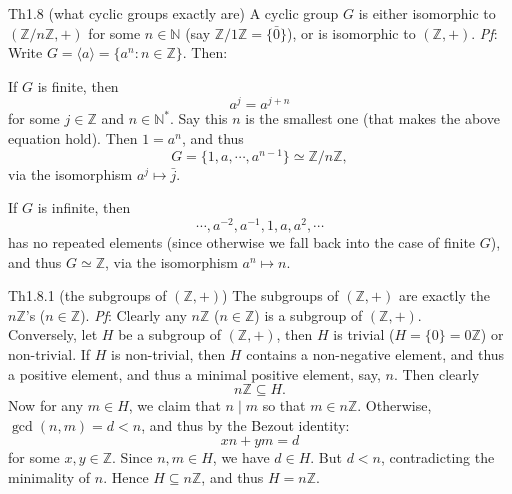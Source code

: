 \documentclass{article}
\begin{document}
\begin{Th}{Th1.8 (what cyclic groups exactly are)}
    A cyclic group $G$ is either isomorphic to $(\mathbb{Z}/n\mathbb{Z}, +)$ for some $n\in\mathbb{N}$ (say $\mathbb{Z}/1\mathbb{Z} = \{\bar{0}\}$), or is isomorphic to $(\mathbb{Z}, +)$.
    \tcblower
    \textit{Pf}: Write $G = \langle a\rangle = \{a^n: n\in\mathbb{Z}\}$. Then:
    \begin{compactenum}
        \item If $G$ is finite, then 
        $$ a^j = a^{j+n} $$
        for some $j\in\mathbb{Z}$ and $n\in\mathbb{N}^\ast$. Say this $n$ is the smallest one (that makes the above equation hold). Then $1 = a^n$, and thus
        $$ G = \{1, a, \cdots, a^{n-1}\} \simeq \mathbb{Z}/n\mathbb{Z}, $$
        via the isomorphism $a^j\mapsto \bar{j}$.
        \item If $G$ is infinite, then 
        $$ \cdots, a^{-2}, a^{-1}, 1, a, a^2, \cdots $$
        has no repeated elements (since otherwise we fall back into the case of finite $G$), and thus $G\simeq\mathbb{Z}$, via the isomorphism $a^n\mapsto n$.
    \end{compactenum}
\end{Th}

\begin{Th}{Th1.8.1 (the subgroups of $(\mathbb{Z}, +)$)}
    The subgroups of $(\mathbb{Z}, +)$ are exactly the $n\mathbb{Z}$'s ($n\in\mathbb{Z}$).
    \tcblower
    \textit{Pf}: Clearly any $n\mathbb{Z}$ ($n\in\mathbb{Z}$) is a subgroup of $(\mathbb{Z}, +)$. \\
    Conversely, let $H$ be a subgroup of $(\mathbb{Z}, +)$, then $H$ is trivial ($H = \{0\} = 0\mathbb{Z}$) or non-trivial. If $H$ is non-trivial, then $H$ contains a non-negative element, and thus a positive element, and thus a minimal positive element, say, $n$. Then clearly
    $$ n\mathbb{Z} \subseteq H. $$
    Now for any $m\in H$, we claim that $n\mid m$ so that $m\in n\mathbb{Z}$. Otherwise, $\gcd(n, m) = d < n$, and thus by the Bezout identity:
    $$ xn + ym = d $$
    for some $x, y\in\mathbb{Z}$. Since $n, m\in H$, we have $d\in H$. But $d<n$, contradicting the minimality of $n$. Hence $H\subseteq n\mathbb{Z}$, and thus $H = n\mathbb{Z}$.
\end{Th}
\end{document}
